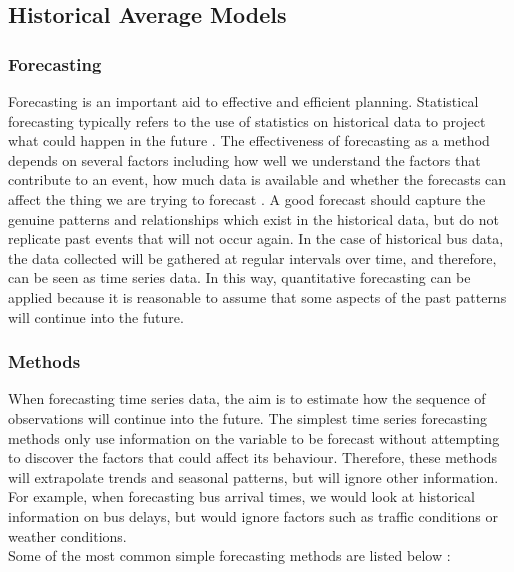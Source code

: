 \subsection{Historical Average Models}
\label{section:historical-avg-models-research}

\subsubsection{Forecasting}
Forecasting is an important aid to effective and efficient planning. Statistical forecasting typically refers to the use of statistics on historical data to project what could happen in the future \cite{what-is-forecasting}. The effectiveness of forecasting as a method depends on several factors including how well we understand the factors that contribute to an event, how much data is available and whether the forecasts can affect the thing we are trying to forecast \cite{forecasting-book}. A good forecast should capture the genuine patterns and relationships which exist in the historical data, but do not replicate past events that will not occur again. In the case of historical bus data, the data collected will be gathered at regular intervals over time, and therefore, can be seen as time series data. In this way, quantitative forecasting can be applied because it is reasonable to assume that some aspects of the past patterns will continue into the future.

\subsubsection{Methods}

When forecasting time series data, the aim is to estimate how the sequence of observations will continue into the future. The simplest time series forecasting methods only use information on the variable to be forecast without attempting to discover the factors that could affect its behaviour. Therefore, these methods will extrapolate trends and seasonal patterns, but will ignore other information. For example, when forecasting bus arrival times, we would look at historical information on bus delays, but would ignore factors such as traffic conditions or weather conditions. \\

Some of the most common simple forecasting methods are listed below \cite{forecasting-book}:

